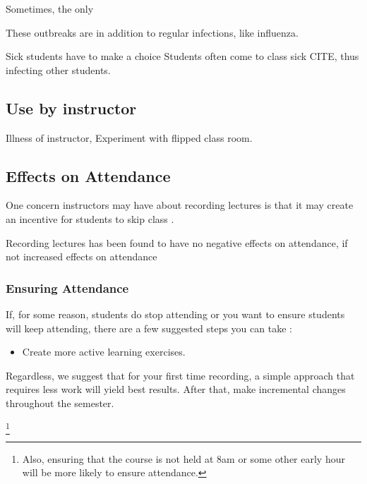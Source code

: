 \documentclass[sigconf]{acmart}
\begin{document}
Sometimes, the only 

These outbreaks are in addition to regular infections, like influenza. 


Sick students have to make a choice
Students often come to class sick CITE, thus infecting other students.




\subsection{Use by instructor}
Illness of instructor, 
Experiment with flipped class room.


\subsection{Effects on Attendance}
One concern instructors may have about recording lectures is that it may create an incentive for students to skip class \cite{larkin2010but}.




Recording lectures has been found to have no negative effects on attendance, if not increased effects on attendance \cite{shimoff2001effects}

\subsubsection{Ensuring Attendance}
If, for some reason, students do stop attending or you want to ensure students will keep attending, there are a few suggested steps you can take \cite{larkin2010but}:
\begin{itemize}
	\item Create more active learning exercises.
\end{itemize}

Regardless, we suggest that for your first time recording, a simple approach that requires less work will yield best results.  
After that, make incremental changes throughout the semester.

\footnote{Also, ensuring that the course is not held at 8am or some other early hour will be more likely to ensure attendance.}
\end{document}
